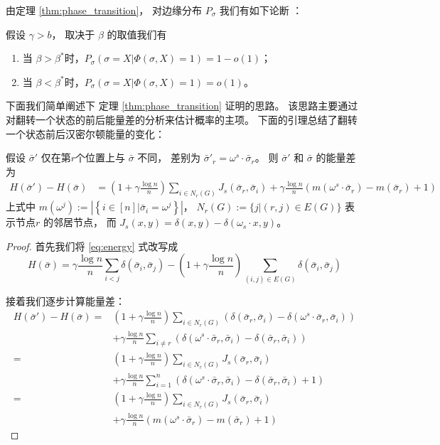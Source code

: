 由定理 \ref{thm:phase_transition}， 对边缘分布 $P_{\sigma}$ 我们有如下论断
：
\begin{corollary}\label{cor:phase4}
假设 $\gamma > b$， 取决于 $\beta$ 的取值我们有
\begin{enumerate}
	\item 当 $\beta > \beta^*$时，$P_{\sigma}(\sigma = X | \Phi(\sigma, X)=1)  = 1-o(1)$；
	\item 当 $\beta < \beta^*$时，$P_{\sigma}(\sigma = X | \Phi(\sigma, X)=1)  = o(1)$。
\end{enumerate}
\end{corollary}

下面我们简单阐述下 定理 \ref{thm:phase_transition} 证明的思路。
该思路主要通过对翻转一个状态的前后能量差的分析来估计概率的主项。
下面的引理总结了翻转一个状态前后汉密尔顿能量的变化：
\begin{lemma}\label{lem:lemmaDiff}
	假设 $\bar{\sigma}'$ 仅在第$r$个位置上与 $\bar{\sigma}$ 不同，
	差别为 $\bar{\sigma}'_r = \omega^s \cdot \bar{\sigma}_r$。
	则 $\bar{\sigma}'$ 和 $\bar{\sigma}$ 的能量差为
\begin{align}
	H(\bar{\sigma}') - H(\bar{\sigma}) &= \left(1+\gamma \frac{\log n}{n} \right)
	\sum_{i \in N_r(G)} J_s(\bar{\sigma}_r, \bar{\sigma}_i)
	+ \gamma \frac{\log n}{n} (m(\omega^s \cdot \bar{\sigma}_r)-m(\bar{\sigma}_r)+1) \label{eq:DeltaH}
	\end{align}
	上式中 $m(\omega^j) := \left|\left\{i \in [n] | \bar{\sigma}_i = \omega^j \right\} \right| $，
	$N_r(G):=\{j | (r, j) \in E(G) \}$ 表示节点$r$
	的邻居节点，
	而 $J_s(x, y) = \delta(x, y) - \delta(\omega_s \cdot x, y)$。
\end{lemma}
\begin{proof}
	首先我们将
  \eqref{eq:energy} 式改写成
	\begin{equation*}
	H(\bar{\sigma}) = \gamma \frac{\log n}{n} \sum_{i < j} \delta(\bar{\sigma}_i, \bar{\sigma}_j)
	- \left(1 + \gamma\frac{\log n}{n} \right)
	\sum_{ (i,j) \in E(G)} \delta(\bar{\sigma}_i, \bar{\sigma}_j)
	\end{equation*}
	
	接着我们逐步计算能量差：
  \begin{align*}
	H(\bar{\sigma}') - H(\bar{\sigma}) =& 
  \left(1 + \gamma\frac{\log n}{n}
  \right)
   \sum_{i \in N_r(G)} (\delta(\bar{\sigma}_r, \bar{\sigma}_i) -
	\delta(\omega^s \cdot \bar{\sigma}_r, \bar{\sigma}_i)) \\
	&+ \gamma \frac{\log n}{n}\sum_{i\neq r}
	( \delta(\omega^s \cdot \bar{\sigma}_r, \bar{\sigma}_i) -
	\delta( \bar{\sigma}_r, \bar{\sigma}_i) ) \\
	 =& \left(
     1 + \gamma\frac{\log n}{n}
     \right)
   \sum_{i \in N_r(G)} J_s(\bar{\sigma}_r, \bar{\sigma}_i) \\
	&+ \gamma \frac{\log n}{n}\sum_{i=1}^n
	( \delta(\omega^s \cdot \bar{\sigma}_r, \bar{\sigma}_i) -
	\delta( \bar{\sigma}_r, \bar{\sigma}_i) +1) \\
	=& \left(1+\gamma \frac{\log n}{n}
  \right)
  \sum_{i \in N_r(G)} J_s(\bar{\sigma}_r, \bar{\sigma}_i)\\
	&+ \gamma \frac{\log n}{n} (m(\omega^s \cdot \bar{\sigma}_r)-m(\bar{\sigma}_r)+1)
	\end{align*}
\end{proof}
